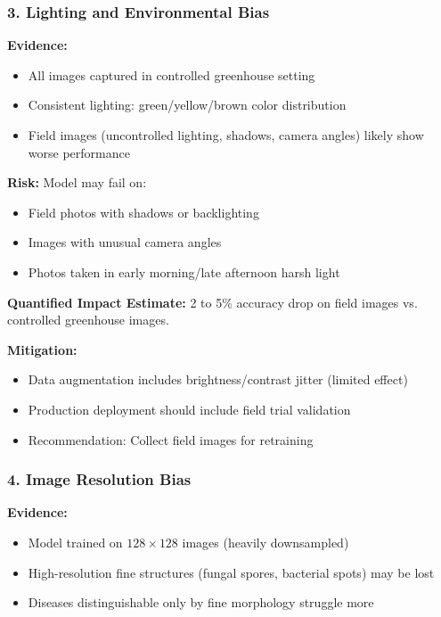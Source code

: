 \documentclass[11pt,a4paper]{article}
\begin{document}
\subsubsection{3. Lighting and Environmental Bias}

\textbf{Evidence:}
\begin{itemize}
    \item All images captured in controlled greenhouse setting
    \item Consistent lighting: green/yellow/brown color distribution
    \item Field images (uncontrolled lighting, shadows, camera angles) likely show worse performance
\end{itemize}

\textbf{Risk:} Model may fail on:
\begin{itemize}
  \item Field photos with shadows or backlighting
  \item Images with unusual camera angles
  \item Photos taken in early morning/late afternoon harsh light
\end{itemize}

\textbf{Quantified Impact Estimate:} 2 to 5\% accuracy drop on field images vs. controlled greenhouse images.

\textbf{Mitigation:}
\begin{itemize}
  \item Data augmentation includes brightness/contrast jitter (limited effect)
  \item Production deployment should include field trial validation
  \item Recommendation: Collect field images for retraining
\end{itemize}

\subsubsection{4. Image Resolution Bias}

\textbf{Evidence:}
\begin{itemize}
    \item Model trained on $128 \times 128$ images (heavily downsampled)
    \item High-resolution fine structures (fungal spores, bacterial spots) may be lost
    \item Diseases distinguishable only by fine morphology struggle more
\end{itemize}
\end{document}
